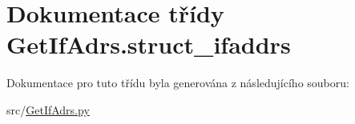\hypertarget{classGetIfAdrs_1_1struct__ifaddrs}{\section{Dokumentace třídy Get\-If\-Adrs.\-struct\-\_\-ifaddrs}
\label{dc/dd7/classGetIfAdrs_1_1struct__ifaddrs}
}


Dokumentace pro tuto třídu byla generována z následujícího souboru\-:\begin{DoxyCompactItemize}
\item 
src/\hyperlink{GetIfAdrs_8py}{Get\-If\-Adrs.\-py}\end{DoxyCompactItemize}
